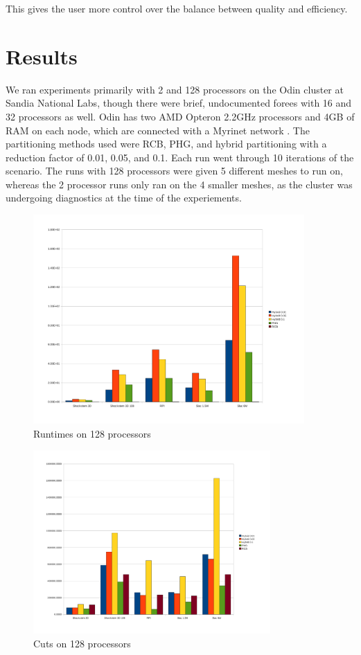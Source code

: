 \documentclass[12pt]{article}
\begin{document}
This gives the user more control over the balance between quality
and efficiency.


\section{Results}
We ran experiments primarily with 2 and 128 processors on the Odin cluster
at Sandia National Labs, though there were brief, undocumented forees with
16 and 32 processors as well. Odin has two AMD Opteron 2.2GHz processors
and 4GB of RAM on each node, which are connected with a Myrinet network
\cite{Catalyurek}. The partitioning methods used were RCB, PHG, and hybrid
partitioning with a reduction factor of 0.01, 0.05, and 0.1. Each run went
through 10 iterations of the scenario. The runs with 128 processors were
given 5 different meshes to run on, whereas the 2 processor runs only ran
on the 4 smaller meshes, as the cluster was undergoing diagnostics at the
time of the experiements.

\begin{figure}[hgp]
  \centering
  \includegraphics[width=\textwidth, height=80mm]{128_time.pdf}
  \caption{Runtimes on 128 processors}\label{fig:Times_np_128}
\end{figure}



\begin{figure}[hgp]
  \centering
  \includegraphics[width=\textwidth, height=70mm]{128_cutl.pdf}
  \caption{Cuts on 128 processors}\label{fig:Cuts_np_128}
\end{figure}
\end{document}

